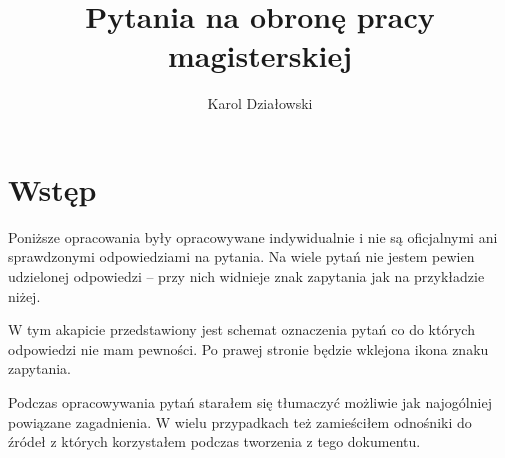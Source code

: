 \documentclass[wi]{zut}
\author{Karol Działowski}
\title{Pytania na obronę pracy magisterskiej}
\begin{document}
\maketitle
\tableofcontents

\section{Wstęp}

Poniższe opracowania były opracowywane indywidualnie i nie są oficjalnymi ani sprawdzonymi odpowiedziami na pytania. Na wiele pytań nie jestem pewien udzielonej odpowiedzi -- przy nich widnieje znak zapytania jak na przykładzie niżej.

W tym akapicie przedstawiony jest schemat oznaczenia pytań co do których odpowiedzi nie mam pewności. Po prawej stronie będzie wklejona ikona znaku zapytania.
\question

Podczas opracowywania pytań starałem się tłumaczyć możliwie jak najogólniej powiązane zagadnienia. W wielu przypadkach też zamieściłem odnośniki do źródeł z których korzystałem podczas tworzenia z tego dokumentu.





\end{document}
